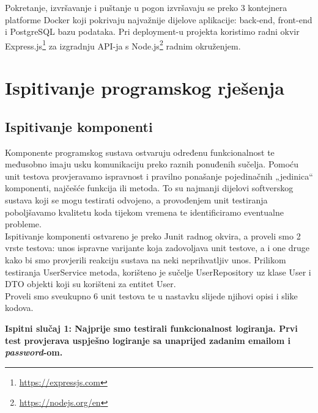 Pokretanje, izvršavanje i puštanje u pogon izvršavaju se preko 3 kontejnera platforme Docker koji pokrivaju najvažnije dijelove aplikacije: back-end, front-end i PostgreSQL bazu podataka. Pri deployment-u projekta koristimo radni okvir Express.js\footnote{\url{https://expressjs.com}} za izgradnju API-ja s Node.js\footnote{\url{https://nodejs.org/en}} radnim okruženjem.

			
			\eject 
		
	
		\section{Ispitivanje programskog rješenja}
	
			
			\subsection{Ispitivanje komponenti}
			
			Komponente programskog sustava ostvaruju određenu funkcionalnost te međusobno imaju usku komunikaciju preko raznih ponuđenih sučelja. Pomoću unit testova provjeravamo ispravnost i pravilno ponašanje pojedinačnih „jedinica“ komponenti, najčešće funkcija ili metoda. To su najmanji dijelovi softverskog sustava koji se mogu testirati odvojeno, a provođenjem unit testiranja poboljšavamo kvalitetu koda tijekom vremena te identificiramo eventualne probleme. \\
			
Ispitivanje komponenti ostvareno je preko Junit radnog okvira, a proveli smo 2 vrste testova: unos ispravne varijante koja zadovoljava unit testove, a i one druge kako bi smo provjerili reakciju sustava na neki neprihvatljiv unos.  Prilikom testiranja UserService metoda, korišteno je sučelje UserRepository uz klase User i DTO objekti koji su korišteni za entitet User.\\
Proveli smo sveukupno 6 unit testova te u nastavku slijede njihovi opisi i slike kodova.

\pagebreak

\textbf{Ispitni slučaj 1: Najprije smo testirali funkcionalnost logiranja. Prvi test provjerava uspješno logiranje sa unaprijed zadanim emailom i \textit{password}-om.}

